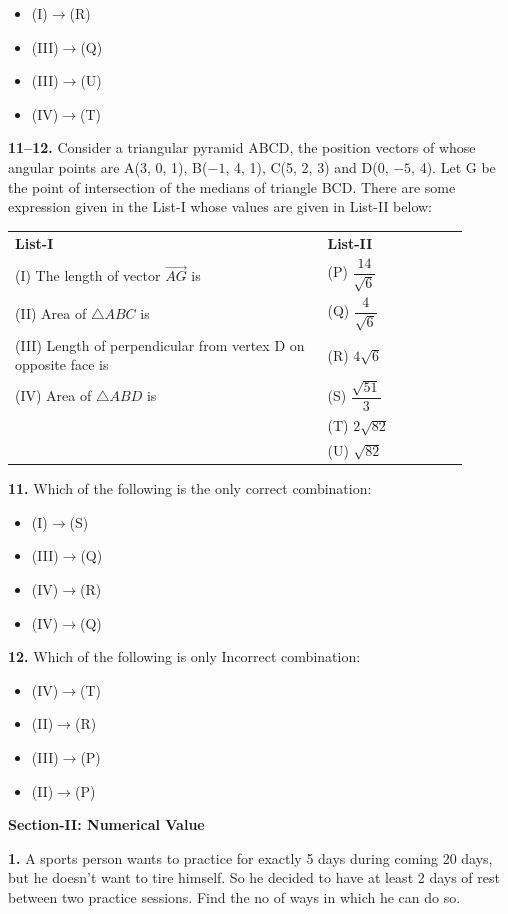\documentclass[10pt,twocolumn]{extarticle}
\renewcommand{\arraystretch}{1.15}
\newenvironment{qoptions}{\begin{itemize}[leftmargin=1.8em,itemsep=2pt,topsep=2pt,label={}]}{\end{itemize}}
\newcommand{\opt}[2]{\item[({#1})] {#2}}
\newcommand{\subsectionhdr}[1]{\par\vspace{3pt}\noindent\textbf{#1}\par\vspace{2pt}}
\begin{document}
\begin{qoptions}
\opt{A}{(I)$\to$(R)}
\opt{B}{(III)$\to$(Q)}
\opt{C}{(III)$\to$(U)}
\opt{D}{(IV)$\to$(T)}
\end{qoptions}

\textbf{11--12.} Consider a triangular pyramid ABCD, the position vectors of whose angular points are A(3, 0, 1), B($-1$, 4, 1), C(5, 2, 3) and D(0, $-5$, 4). Let G be the point of intersection of the medians of triangle BCD. There are some expression given in the List-I whose values are given in List-II below:

\begin{center}
\renewcommand{\arraystretch}{1.3}
\begin{tabular}{@{}p{0.62\linewidth}p{0.28\linewidth}@{}}
\textbf{List-I} & \textbf{List-II}\\
(I) The length of vector $\overrightarrow{AG}$ is & (P) $\dfrac{14}{\sqrt6}$\\
(II) Area of $\triangle ABC$ is & (Q) $\dfrac{4}{\sqrt6}$\\
(III) Length of perpendicular from vertex D on opposite face is & (R) $4\sqrt6$\\
(IV) Area of $\triangle ABD$ is & (S) $\dfrac{\sqrt{51}}{3}$\\
& (T) $2\sqrt{82}$\\
& (U) $\sqrt{82}$\\
\end{tabular}
\renewcommand{\arraystretch}{1.15}
\end{center}

\textbf{11.} Which of the following is the only correct combination:

\begin{qoptions}
\opt{A}{(I)$\to$(S)}
\opt{B}{(III)$\to$(Q)}
\opt{C}{(IV)$\to$(R)}
\opt{D}{(IV)$\to$(Q)}
\end{qoptions}

\textbf{12.} Which of the following is only Incorrect combination:

\begin{qoptions}
\opt{A}{(IV)$\to$(T)}
\opt{B}{(II)$\to$(R)}
\opt{C}{(III)$\to$(P)}
\opt{D}{(II)$\to$(P)}
\end{qoptions}

\subsectionhdr{Section-II: Numerical Value}

\textbf{1.} A sports person wants to practice for exactly 5 days during coming 20 days, but he doesn't want to tire himself. So he decided to have at least 2 days of rest between two practice sessions. Find the no of ways in which he can do so.
\end{document}
